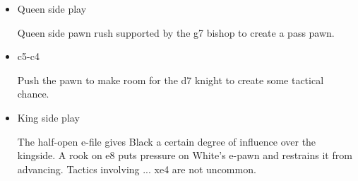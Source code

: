\begin{itemize}
    \item{Queen side play}

    Queen side pawn rush supported by the g7 bishop to create a pass pawn. 

    \item{c5-c4}

    Push the pawn to make room for the d7 knight to create some tactical chance.
    \item{King side play}

    The half-open e-file gives Black a certain degree of influence over the kingside. A rook on e8 puts pressure on White's e-pawn and restrains it from advancing. Tactics involving ...\symknight{} xe4 are not uncommon.

    
    
\end{itemize} 



